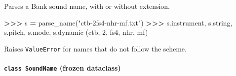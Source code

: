 \documentclass[
  10pt,
]{article}
\newenvironment{Shaded}{\begin{snugshade}}{\end{snugshade}}
\newcommand{\DecValTok}[1]{\textcolor[rgb]{0.00,0.00,0.81}{#1}}
\newcommand{\NormalTok}[1]{#1}
\newcommand{\OperatorTok}[1]{\textcolor[rgb]{0.81,0.36,0.00}{\textbf{#1}}}
\newcommand{\StringTok}[1]{\textcolor[rgb]{0.31,0.60,0.02}{#1}}
\begin{document}
Parses a Bank sound name, with or without extension.

\begin{Shaded}
\begin{Highlighting}[]
\OperatorTok{\textgreater{}\textgreater{}\textgreater{}}\NormalTok{ s }\OperatorTok{=}\NormalTok{ parse\_name(}\StringTok{"ctb{-}2fs4{-}nhr{-}mf.txt"}\NormalTok{)}
\OperatorTok{\textgreater{}\textgreater{}\textgreater{}}\NormalTok{ s.instrument, s.string, s.pitch, s.mode, s.dynamic}
\NormalTok{(}\StringTok{\textquotesingle{}ctb\textquotesingle{}}\NormalTok{, }\DecValTok{2}\NormalTok{, }\StringTok{\textquotesingle{}fs4\textquotesingle{}}\NormalTok{, }\StringTok{\textquotesingle{}nhr\textquotesingle{}}\NormalTok{, }\StringTok{\textquotesingle{}mf\textquotesingle{}}\NormalTok{)}
\end{Highlighting}
\end{Shaded}

Raises \texttt{ValueError} for names that do not follow the
scheme.

\paragraph{\texorpdfstring{\texttt{class\ SoundName} (frozen
dataclass)}{class SoundName (frozen dataclass)}}
\end{document}
